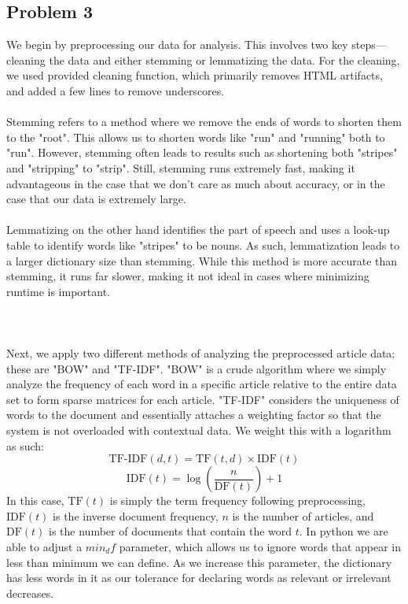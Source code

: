 \documentclass[11pt]{article}
\begin{document}
\begin{multicols}{2}
\subsection*{Problem 3}
We begin by preprocessing our data for analysis. This involves two key steps—cleaning the data and either stemming or lemmatizing the data. For the cleaning, we used provided cleaning function, which primarily removes HTML artifacts, and added a few lines to remove underscores. \\\\
Stemming refers to a method where we remove the ends of words to shorten them to the "root". This allows us to shorten words like "run" and "running" both to "run". However, stemming often leads to results such as shortening both "stripes" and "stripping" to "strip". Still, stemming runs extremely fast, making it advantageous in the case that we don't care as much about accuracy, or in the case that our data is extremely large.
\\\\
Lemmatizing on the other hand identifies the part of speech and uses a look-up table to identify words like "stripes" to be nouns. As such, lemmatization leads to a larger dictionary size than stemming. While this method is more accurate than stemming, it runs far slower, making it not ideal in cases where minimizing runtime is important. \\\\
\\\\
Next, we apply two different methods of analyzing the preprocessed article data; these are "BOW" and "TF-IDF". "BOW" is a crude algorithm where we simply analyze the frequency of each word in a specific article relative to the entire data set to form sparse matrices for each article. "TF-IDF" considers the uniqueness of words to the document and essentially attaches a weighting factor so that the system is not overloaded with contextual data. We weight this with a logarithm as such: $$\text{TF-IDF}(d,t)=\text{TF}(t,d)\times\text{IDF}(t)$$
$$\text{IDF}(t)=\log\left({\dfrac{n}{\text{DF}(t)}}\right)+1$$
In this case, $\text{TF}(t)$ is simply the term frequency following preprocessing,  $\text{IDF}(t)$ is the inverse document frequency, $n$ is the number of articles, and $\text{DF}(t)$ is the number of documents that contain the word $t$. 
In python we are able to adjust a $min_df$ parameter, which allows us to ignore words that appear in less than minimum we can define. As we increase this parameter, the dictionary has less words in it as our tolerance for declaring words as relevant or irrelevant decreases. \\\\

\end{multicols}
\end{document}
